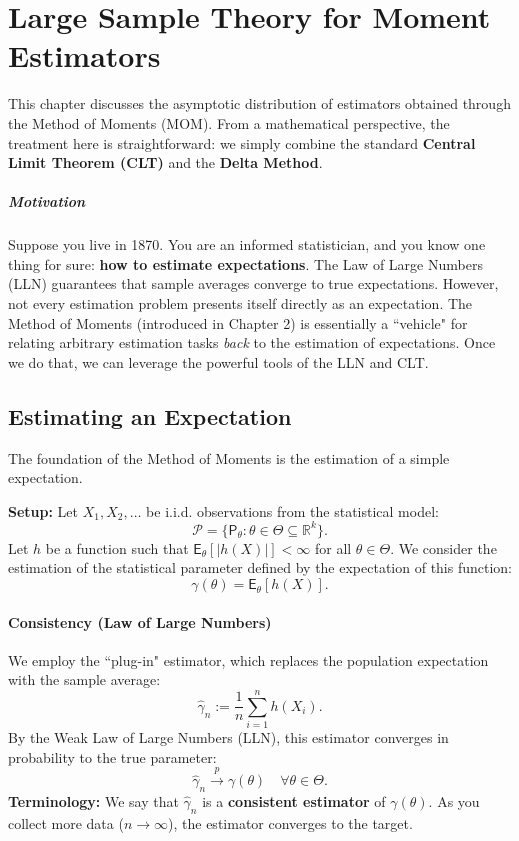 \chapter{Large Sample Theory for Moment Estimators}

This chapter discusses the asymptotic distribution of estimators obtained through the Method of Moments (MOM). From a mathematical perspective, the treatment here is straightforward: we simply combine the standard \textbf{Central Limit Theorem (CLT)} and the \textbf{Delta Method}.

\paragraph{Motivation}%
\label{par:Motivation}

Suppose you live in 1870. You are an informed statistician, and you know one thing for sure: \textbf{how to estimate expectations}. The Law of Large Numbers (LLN) guarantees that sample averages converge to true expectations.
However, not every estimation problem presents itself directly as an expectation. The Method of Moments (introduced in Chapter 2) is essentially a ``vehicle" for relating arbitrary estimation tasks \textit{back} to the estimation of expectations. Once we do that, we can leverage the powerful tools of the LLN and CLT.

\section{Estimating an Expectation}

The foundation of the Method of Moments is the estimation of a simple expectation.

\textbf{Setup:}
Let $X_1, X_2, \dots$ be i.i.d. observations from the statistical model:
\[ \mathcal{P} = \{ \mathsf{P}_{\theta} : \theta \in \Theta \subseteq \mathbb{R}^k \}. \]
Let $h$ be a function such that $\mathsf{E}_{\theta}[|h(X)|] < \infty$ for all $\theta \in \Theta$. We consider the estimation of the statistical parameter defined by the expectation of this function:
\[ \gamma(\theta) = \mathsf{E}_{\theta}[h(X)]. \]

\subsubsection{Consistency (Law of Large Numbers)}
We employ the ``plug-in" estimator, which replaces the population expectation with the sample average:
\[ \hat{\gamma}_n := \frac{1}{n} \sum_{i=1}^{n} h(X_i). \]
By the Weak Law of Large Numbers (LLN), this estimator converges in probability to the true parameter:
\[ \hat{\gamma}_n \xrightarrow{p} \gamma(\theta) \quad \forall \theta \in \Theta. \]
\textbf{Terminology:} We say that $\hat{\gamma}_n$ is a \textbf{consistent estimator} of $\gamma(\theta)$. As you collect more data ($n \to \infty$), the estimator converges to the target.

